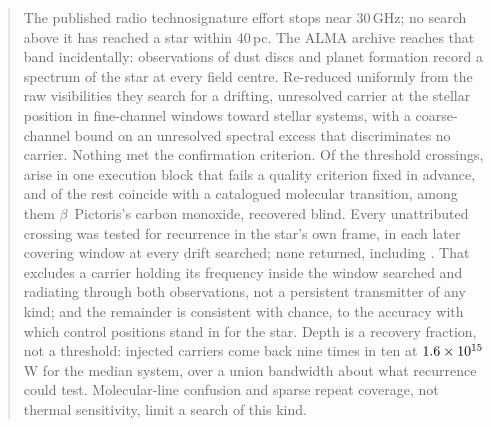 \begin{abstract}
The published radio technosignature effort stops near 30\,GHz; no search
above it has reached a star within 40\,pc. The ALMA archive reaches that
band incidentally: observations of dust discs and planet formation record a
spectrum of the star at every field centre. Re-reduced uniformly from the
raw visibilities they search for a drifting, unresolved carrier at the
stellar position in \NWinA{} fine-channel windows toward \NSysClassA{}
stellar systems, with a coarse-channel bound on an unresolved spectral
excess that discriminates no carrier. Nothing met the confirmation
criterion. Of the \EvNCrossRaw{} threshold crossings, \PrFlagXrossWord{}
arise in one execution block that fails a quality criterion fixed in
advance, and \EvNAttrQp{} of the rest coincide with a catalogued molecular
transition, among them $\beta$~Pictoris's carbon monoxide, recovered blind. Every
unattributed crossing was tested for recurrence in the star's own frame, in
each later covering window at every drift searched; none returned, including
\PrRankClause. That excludes a carrier holding its frequency inside the
window searched and radiating through both observations, not a persistent
transmitter of any kind; and the remainder is consistent with chance, to the
accuracy with which control positions stand in for the star. Depth is a recovery
fraction, not a threshold: injected carriers come back nine times in ten at
$\EirpNinetySysMedA$\,W for the median system, over a union bandwidth about
\PrConfFactor{} what recurrence could test. Molecular-line confusion and
sparse repeat coverage, not thermal sensitivity, limit a search of this
kind.
\end{abstract}


